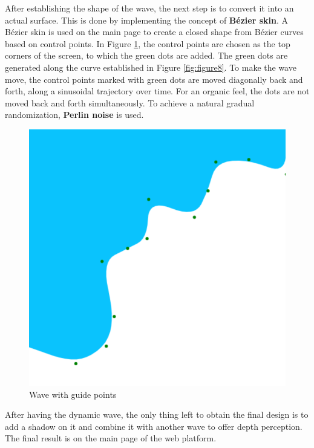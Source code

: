\noindent After establishing the shape of the wave, the next step is to convert it into an actual surface. This is done by implementing the concept of \textbf{Bézier skin}. A Bézier skin is used on the main page to create a closed shape from Bézier curves based on control points. In Figure \ref{fig:figure9}, the control points are chosen as the top corners of the screen, to which the green dots are added. The green dots are generated along the curve established in Figure \ref{fig:figure8}. To make the wave move, the control points marked with green dots are moved diagonally back and forth, along a sinusoidal trajectory over time. For an organic feel, the dots are not moved back and forth simultaneously. To achieve a natural gradual randomization, \textbf{Perlin noise} is used.

\begin{figure}[h]
    \centering
    \includegraphics[scale=0.6]{images/bezier-wave-with-guides.png}
    \caption{Wave with guide points}
    \label{fig:figure9}
\end{figure}

\noindent After having the dynamic wave, the only thing left to obtain the final design is to add a shadow on it and combine it with another wave to offer depth perception. The final result is on the main page of the web platform.

